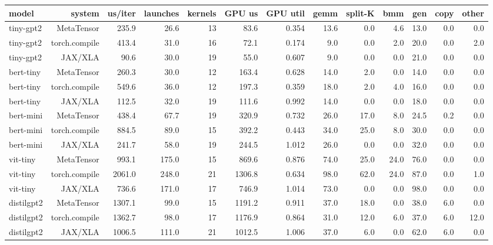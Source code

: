\begin{tabular}{lrrrrrrrrrrrr}
\toprule
model & system & us/iter & launches & kernels & GPU us & GPU util & gemm & split-K & bmm & gen & copy & other \\
\midrule
tiny-gpt2 & MetaTensor & 235.9 & 26.6 & 13 & 83.6 & 0.354 & 13.6 & 0.0 & 4.6 & 13.0 & 0.0 & 0.0 \\
tiny-gpt2 & torch.compile & 413.4 & 31.0 & 16 & 72.1 & 0.174 & 9.0 & 0.0 & 2.0 & 20.0 & 0.0 & 2.0 \\
tiny-gpt2 & JAX/XLA & 90.6 & 30.0 & 19 & 55.0 & 0.607 & 9.0 & 0.0 & 0.0 & 21.0 & 0.0 & 0.0 \\
bert-tiny & MetaTensor & 260.3 & 30.0 & 12 & 163.4 & 0.628 & 14.0 & 2.0 & 0.0 & 14.0 & 0.0 & 0.0 \\
bert-tiny & torch.compile & 549.6 & 36.0 & 12 & 197.3 & 0.359 & 18.0 & 2.0 & 4.0 & 16.0 & 0.0 & 0.0 \\
bert-tiny & JAX/XLA & 112.5 & 32.0 & 19 & 111.6 & 0.992 & 14.0 & 0.0 & 0.0 & 18.0 & 0.0 & 0.0 \\
bert-mini & MetaTensor & 438.4 & 67.7 & 19 & 320.9 & 0.732 & 26.0 & 17.0 & 8.0 & 24.5 & 0.2 & 0.0 \\
bert-mini & torch.compile & 884.5 & 89.0 & 15 & 392.2 & 0.443 & 34.0 & 25.0 & 8.0 & 30.0 & 0.0 & 0.0 \\
bert-mini & JAX/XLA & 241.7 & 58.0 & 19 & 244.5 & 1.012 & 26.0 & 0.0 & 0.0 & 32.0 & 0.0 & 0.0 \\
vit-tiny & MetaTensor & 993.1 & 175.0 & 15 & 869.6 & 0.876 & 74.0 & 25.0 & 24.0 & 76.0 & 0.0 & 0.0 \\
vit-tiny & torch.compile & 2061.0 & 248.0 & 21 & 1306.8 & 0.634 & 98.0 & 62.0 & 24.0 & 87.0 & 0.0 & 1.0 \\
vit-tiny & JAX/XLA & 736.6 & 171.0 & 17 & 746.9 & 1.014 & 73.0 & 0.0 & 0.0 & 98.0 & 0.0 & 0.0 \\
distilgpt2 & MetaTensor & 1307.1 & 99.0 & 15 & 1191.2 & 0.911 & 37.0 & 18.0 & 0.0 & 38.0 & 6.0 & 0.0 \\
distilgpt2 & torch.compile & 1362.7 & 98.0 & 17 & 1176.9 & 0.864 & 31.0 & 12.0 & 6.0 & 37.0 & 6.0 & 12.0 \\
distilgpt2 & JAX/XLA & 1006.5 & 111.0 & 21 & 1012.5 & 1.006 & 37.0 & 6.0 & 0.0 & 62.0 & 6.0 & 0.0 \\
\bottomrule
\end{tabular}
